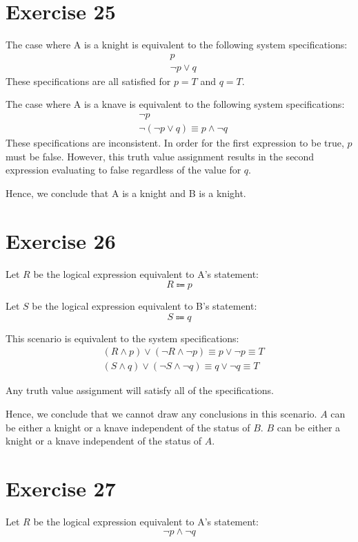 \documentclass{article}
\begin{document}
\section{Exercise 25}
The case where A is a knight is equivalent to the following system specifications:
\begin{align*}
	 & p             \\
	 & \neg p \lor q
\end{align*}
These specifications are all satisfied for $p = T$ and $q = T$.

The case where A is a knave is equivalent to the following system specifications:
\begin{align*}
	 & \neg p                                     \\
	 & \neg (\neg p \lor q) \equiv p \land \neg q
\end{align*}
These specifications are inconsistent. In order for the first expression to be true, $p$ must be false.  However, this truth value assignment results in the second expression evaluating to false regardless of the value for $q$.

Hence, we conclude that A is a knight and B is a knight.

\pagebreak

\section{Exercise 26}
Let $R$ be the logical expression equivalent to A's statement:
\[
	R \Coloneqq p
\]

Let $S$ be the logical expression equivalent to B's statement:
\[
	S \Coloneqq q
\]

This scenario is equivalent to the system specifications:
\begin{align*}
	 & (R \land p) \lor (\neg R \land \neg p) \equiv p \lor \neg p \equiv T \\
	 & (S \land q) \lor (\neg S \land \neg q) \equiv q \lor \neg q \equiv T
\end{align*}

Any truth value assignment will satisfy all of the specifications.

Hence, we conclude that we cannot draw any conclusions in this scenario. $A$ can be either a knight or a knave independent of the status of $B$. $B$ can be either a knight or a knave independent of the status of $A$.

\pagebreak

\section{Exercise 27}
Let $R$ be the logical expression equivalent to A's statement:
\[
	\neg p \land \neg q
\]
\end{document}

